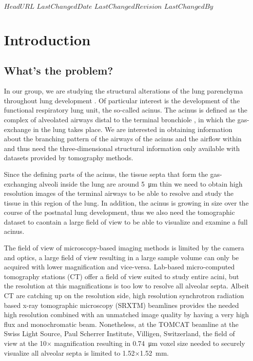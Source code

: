 \svnidlong
{$HeadURL$}
{$LastChangedDate$}
{$LastChangedRevision$}
{$LastChangedBy$}
%
\section{Introduction}
\subsection{What's the problem?}
In our group, we are studying the structural alterations of the lung parenchyma throughout lung development \cite{Schittny2008,Mund2008,Tsuda2008}. Of particular interest is the development of the functional respiratory lung unit, the so-called acinus. The acinus is defined as the complex of alveolated airways distal to the terminal bronchiole \cite{Rodriguez1987}, in which the gas-exchange in the lung takes place. We are interested in obtaining information about the branching pattern of the airways of the acinus and the airflow within and thus need the three-dimensional structural information only available with datasets provided by tomography methods.

Since the defining parts of the acinus, the tissue septa that form the gas-exchanging alveoli inside the lung are around \SI{5}{\micro\meter} thin \cite{Weibel2009} we need to obtain high resolution images of the terminal airways to be able to resolve and study the tissue in this region of the lung. In addition, the acinus is growing in size over the course of the postnatal lung development, thus we also need the tomographic dataset to caontain a large field of view to be able to visualize and examine a full acinus.

The field of view of microscopy-based imaging methods is limited by the camera and optics, a large field of view resulting in a large sample volume can only be acquired with lower magnification and vice-versa. Lab-based micro-computed tomography stations (\micro CT) offer a field of view suited to study entire acini, but the resolution at this magnifications is too low to resolve all alveolar septa. Albeit \micro CT are catching up on the resolution side, high resolution synchrotron radiation based x-ray tomographic microscopy (SRXTM) beamlines provides the needed high resolution combined with an unmatched image quality by having a very high flux and monochromatic beam. Nonetheless, at the TOMCAT beamline \cite{Stampanoni2007} at the Swiss Light Source, Paul Scherrer Institute, Villigen, Switzerland, the field of view at the 10$\times$ magnification resulting in \SI{0.74}{\micro\meter} voxel size needed to securely visualize all alveolar septa is limited to 1.52$\times$\SI{1.52}{\milli\meter}.


